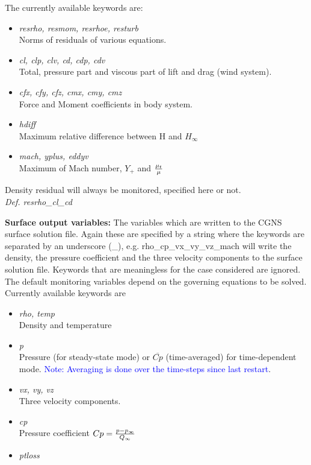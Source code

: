 \documentclass[12pt,epsf,colordvi]{article}
\begin{document}
\begin{description}
The currently available keywords are: 
		\begin{itemize}
			\item	{\it resrho, resmom, resrhoe, resturb} \\
Norms of residuals of various equations.
			\item {\it 	cl, clp, clv, cd, cdp, cdv } \\
Total, pressure part and viscous part of lift and drag (wind system).
			\item {\it 	cfx, cfy, cfz, cmx, cmy, cmz  } \\
Force and Moment coefficients in body system.
			\item	{\it hdiff } \\
Maximum relative difference between H and \(H_\infty\)
			\item {\it  mach, yplus, eddyv } \\
Maximum of Mach number, \(Y_+\) and \({\mu_t \over \mu } \)
		\end{itemize} 
	Density residual will always be monitored, specified here or not. \\
 	{\it Def.  resrho\_cl\_cd}
%
	\item{\bf Surface output variables:}  
The variables which are written to the CGNS surface solution file. Again these are specified by a string where the keywords are separated by an underscore (\_), e.g. rho\_cp\_vx\_vy\_vz\_mach will write the density, the pressure coefficient and the three velocity components to the surface solution file. Keywords that are meaningless for the case considered are ignored. The default monitoring variables depend on the governing equations to be solved. Currently available keywords are 
		\begin{itemize}
			\item {\it rho,  temp } \\
Density and temperature
			\item {\it p } \\
Pressure (for steady-state mode) or \(\overline{Cp}\) (time-averaged) for time-dependent mode.  \textcolor{blue}{Note: Averaging is done over the time-steps since last restart}.
			\item {\it vx, vy, vz } \\
Three velocity components. 
			\item {\it cp } \\
Pressure coefficient \(Cp={{p - p_\infty } \over Q_\infty } \)
			\item {\it ptloss } \\

\end{itemize}
\end{description}
\end{document}

